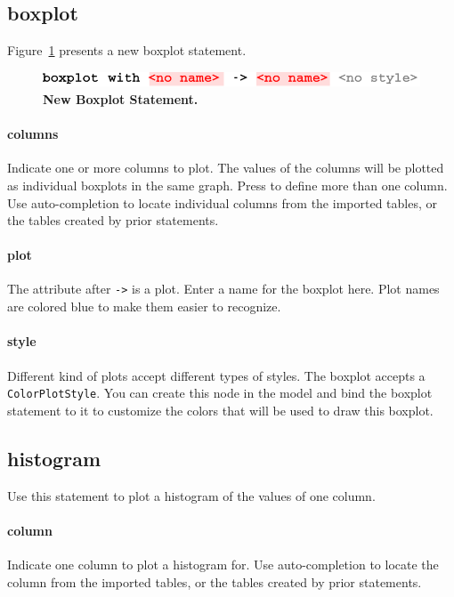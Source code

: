 \subsection{boxplot}
Figure~\ref{fig:NewBoxPlot} presents a new boxplot statement.

\begin{figure}
  \centering
  \includegraphics[width=\figWidthNarrow]{figures/NewBoxplot.pdf}
\caption[New Boxplot Statement.]{\textbf{New Boxplot Statement.}}
\label{fig:NewBoxPlot}
\end{figure}

\paragraph{columns}
Indicate one or more columns to plot. The values of the columns will be plotted as individual boxplots in the same graph. Press \keys{\enter} to define more than one column. Use auto-completion to locate individual columns from the imported tables, or the tables created by prior statements. 

\paragraph{plot}
The attribute after \texttt{->} is a plot. Enter a name for the boxplot here. Plot names are colored blue to make them easier to recognize.

\paragraph{style}
Different kind of plots accept different types of styles. The boxplot accepts a \texttt{Color\allowbreak{}Plot\allowbreak{}Style}. You can create this node in the model and bind the boxplot statement to it to customize the colors that will be used to draw this boxplot. 


\subsection{histogram}
Use this statement to plot a histogram of the values of one column.
\paragraph{column}
Indicate one column to plot a histogram for. Use auto-completion to locate the column from the imported tables, or the tables created by prior statements. 

